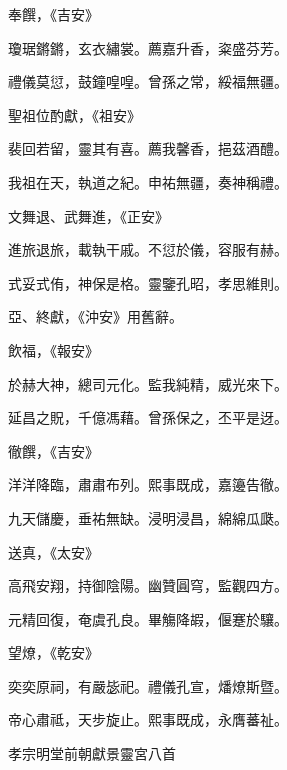 \begin{pinyinscope}
 奉饌，《吉安》



 瓊琚鏘鏘，玄衣繡裳。薦嘉升香，粢盛芬芳。



 禮儀莫愆，鼓鐘喤喤。曾孫之常，綏福無疆。



 聖祖位酌獻，《祖安》



 裴回若留，靈其有喜。薦我馨香，挹茲酒醴。



 我祖在天，執道之紀。申祐無疆，奏神稱禮。



 文舞退、武舞進，《正安》



 進旅退旅，載執干戚。不愆於儀，容服有赫。



 式妥式侑，神保是格。靈鑒孔昭，孝思維則。



 亞、終獻，《沖安》用舊辭。



 飲福，《報安》



 於赫大神，總司元化。監我純精，威光來下。



 延昌之貺，千億馮藉。曾孫保之，丕平是迓。



 徹饌，《吉安》



 洋洋降臨，肅肅布列。熙事既成，嘉籩告徹。



 九天儲慶，垂祐無缺。浸明浸昌，綿綿瓜瓞。



 送真，《太安》



 高飛安翔，持御陰陽。幽贊圓穹，監觀四方。



 元精回復，奄虞孔良。畢觴降嘏，偃蹇於驤。



 望燎，《乾安》



 奕奕原祠，有嚴毖祀。禮儀孔宣，燔燎斯暨。



 帝心肅祗，天步旋止。熙事既成，永膺蕃祉。



 孝宗明堂前朝獻景靈宮八首




\end{pinyinscope}
